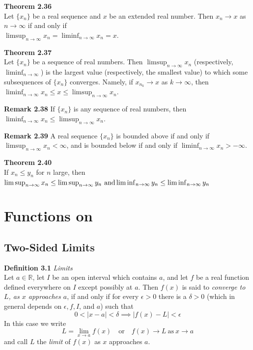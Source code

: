 \documentclass[8pt,landscape]{article}
\begin{document}
\begin{multicols}{3}
    \textbf{Theorem 2.36} \\
    Let $\{x_n\}$ be a real sequence and $x$ be an extended real number.
    Then $x_n \to x$ as $n \to \infty$ if and only if \\
    $\limsup_{n \to \infty} x_n = \liminf_{n \to \infty} x_n = x$.


    \textbf{Theorem 2.37} \\
    Let $\{x_n\}$ be a sequence of real numbers.
    Then $\limsup_{n \to \infty} x_n$ (respectively, $\liminf_{n \to \infty}$) is the
    largest value (respectively, the smallest value) to which some subsequences of
    $\{x_n\}$ converges.
    Namely, if $x_n_k \to x$ as $k \to \infty$, then \\
    $\liminf_{n \to \infty} x_n \leq x \leq \limsup_{n \to \infty} x_n$.

    \textbf{Remark 2.38}
    If $\{x_n\}$ is any sequence of real numbers, then
    $\liminf_{n \to \infty} x_n \leq \limsup_{n \to \infty} x_n$.

    \textbf{Remark 2.39}
    A real sequence $\{x_n\}$ is bounded above if and only if
    $\limsup_{n \to \infty} x_n < \infty$, and is bounded below if and only if
    $\liminf_{n \to \infty} x_n > -\infty$.

    \textbf{Theorem 2.40} \\
    If $x_n \leq y_n$ for $n$ large, then \\
    $\limsup_{n \to \infty} x_n \leq \limsup_{n \to \infty} y_n \ \text{and} \\
    \liminf_{n \to \infty} y_n \leq \liminf_{n \to \infty} y_n$


    \section{Functions on }

    \subsection{Two-Sided Limits}



    \textbf{Definition 3.1} \emph{Limits} \\
    Let $a \in \mathbb{R}$, let $I$ be an open interval which contains $a$, and let $f$ be
    a real function defined everywhere on $I$ except possibly at $a$.
    Then $f(x)$ is said to \emph{converge to $L$, as $x$ approaches $a$},
    if and only if for every $\epsilon > 0$ there is a $\delta > 0$
    (which in general depends on $\epsilon, f, I$, and $a$) such that
    \[
        0 < |x - a| < \delta \implies |f(x) - L| < \epsilon
    \]
    In this case we write
    \[
        L = \lim_{x \to a} f(x) \quad \text{or} \quad f(x) \to L \ \text{as} \ x \to a
    \]
    and call $L$ the \emph{limit} of $f(x)$ as $x$ approaches $a$.



\end{multicols}
\end{document}

